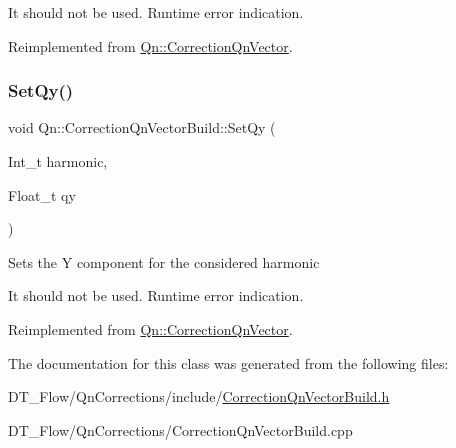 It should not be used. Runtime error indication. 

Reimplemented from \mbox{\hyperlink{classQn_1_1CorrectionQnVector_a6de477e3cecce7c5f5b9212ecbafea59}{Qn\+::\+Correction\+Qn\+Vector}}.

\mbox{\label{classQn_1_1CorrectionQnVectorBuild_a1b9a7e2b0eafc48de05a2f90fcc51fb6}} 
\subsubsection{\texorpdfstring{Set\+Qy()}{SetQy()}}
{\footnotesize\ttfamily void Qn\+::\+Correction\+Qn\+Vector\+Build\+::\+Set\+Qy (\begin{DoxyParamCaption}\item[{Int\+\_\+t}]{harmonic,  }\item[{Float\+\_\+t}]{qy }\end{DoxyParamCaption})\hspace{0.3cm}{\ttfamily [virtual]}}

Sets the Y component for the considered harmonic

It should not be used. Runtime error indication. 

Reimplemented from \mbox{\hyperlink{classQn_1_1CorrectionQnVector_af0ac581e943fe88b0a94838c670f2c4d}{Qn\+::\+Correction\+Qn\+Vector}}.



The documentation for this class was generated from the following files\+:\begin{DoxyCompactItemize}
\item 
D\+T\+\_\+\+Flow/\+Qn\+Corrections/include/\mbox{\hyperlink{CorrectionQnVectorBuild_8h}{Correction\+Qn\+Vector\+Build.\+h}}\item 
D\+T\+\_\+\+Flow/\+Qn\+Corrections/Correction\+Qn\+Vector\+Build.\+cpp\end{DoxyCompactItemize}
